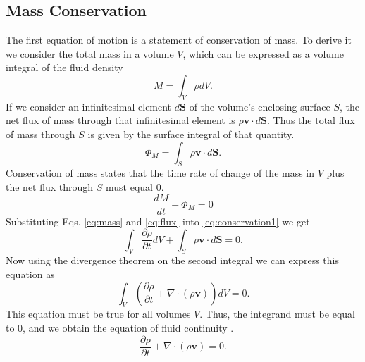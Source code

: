 \documentclass[12pt, letter]{report}
\begin{document}
\subsection{Mass Conservation}
The first equation of motion is a statement of conservation of mass. To derive it we consider the total mass in a volume $V$, which can be expressed as a volume integral of the fluid density
\begin{equation}
\label{eq:mass}
M = \int_V \rho dV.
\end{equation}
If we consider an infinitesimal element $d\textbf{S}$ of the volume's enclosing surface $S$, the net flux of mass through that infinitesimal element is $\rho \textbf{v} \cdot d\textbf{S}$. Thus the total flux of mass through $S$ is given by the surface integral of that quantity.
\begin{equation}
\label{eq:flux}
\Phi_M = \int_S \rho \textbf{v} \cdot d\textbf{S}.
\end{equation}
Conservation of mass states that the time rate of change of the mass in $V$ plus the net flux through $S$ must equal $0$.
\begin{equation}
\label{eq:conservation1}
\frac{d M}{d t} + \Phi_M = 0
\end{equation}
Substituting Eqs. \ref{eq:mass} and \ref{eq:flux} into \ref{eq:conservation1} we get
\begin{equation}
\int_V \frac{\partial \rho}{\partial t} dV + \int_S \rho \textbf{v} \cdot d\textbf{S} = 0.
\end{equation}
Now using the divergence theorem on the second integral we can express this equation as
\begin{equation}
\int_V \left(\frac{\partial \rho}{\partial t} + \nabla \cdot \left( \rho \textbf{v} \right)\right) dV = 0.
\end{equation}
This equation must be true for all volumes $V$. Thus, the integrand must be equal to $0$, and we obtain the equation of fluid continuity \cite{Batchelor2000}.
\begin{equation}
\label{eq:continuity}
\frac{\partial \rho}{\partial t} + \nabla \cdot \left( \rho \textbf{v} \right)=0.
\end{equation}
\end{document}
